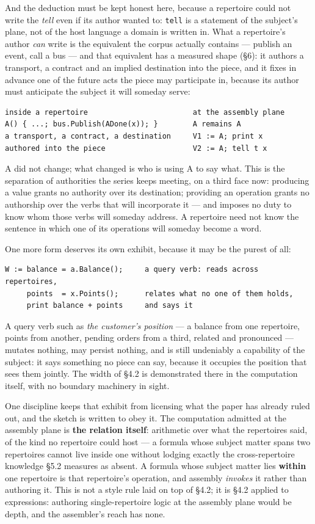 \documentclass[
]{article}
\newcounter{none} %
\begin{document}
And the deduction must be kept honest here, because a repertoire could
not write the \emph{tell} even if its author wanted to: \texttt{tell} is
a statement of the subject's plane, not of the host language a domain is
written in. What a repertoire's author \emph{can} write is the
equivalent the corpus actually contains --- publish an event, call a bus
--- and that equivalent has a measured shape (§6): it authors a
transport, a contract and an implied destination into the piece, and it
fixes in advance one of the future acts the piece may participate in,
because its author must anticipate the subject it will someday serve:

\begin{verbatim}
inside a repertoire                        at the assembly plane
A() { ...; bus.Publish(ADone(x)); }        A remains A
a transport, a contract, a destination     V1 := A; print x
authored into the piece                    V2 := A; tell t x
\end{verbatim}

A did not change; what changed is who is using A to say what. This is
the separation of authorities the series keeps meeting, on a third face
now: producing a value grants no authority over its destination;
providing an operation grants no authorship over the verbs that will
incorporate it --- and imposes no duty to know whom those verbs will
someday address. A repertoire need not know the sentence in which one of
its operations will someday become a word.

One more form deserves its own exhibit, because it may be the purest of
all:

\begin{verbatim}
W := balance = a.Balance();     a query verb: reads across repertoires,
     points  = x.Points();      relates what no one of them holds,
     print balance + points     and says it
\end{verbatim}

A query verb such as \emph{the customer's position} --- a balance from
one repertoire, points from another, pending orders from a third,
related and pronounced --- mutates nothing, may persist nothing, and is
still undeniably a capability of the subject: it says something no piece
can say, because it occupies the position that sees them jointly. The
width of §4.2 is demonstrated there in the computation itself, with no
boundary machinery in sight.

One discipline keeps that exhibit from licensing what the paper has
already ruled out, and the sketch is written to obey it. The computation
admitted at the assembly plane is \textbf{the relation itself}:
arithmetic over what the repertoires said, of the kind no repertoire
could host --- a formula whose subject matter spans two repertoires
cannot live inside one without lodging exactly the cross-repertoire
knowledge §5.2 measures as absent. A formula whose subject matter lies
\textbf{within} one repertoire is that repertoire's operation, and
assembly \emph{invokes} it rather than authoring it. This is not a style
rule laid on top of §4.2; it is §4.2 applied to expressions: authoring
single-repertoire logic at the assembly plane would be depth, and the
assembler's reach has none.
\end{document}

